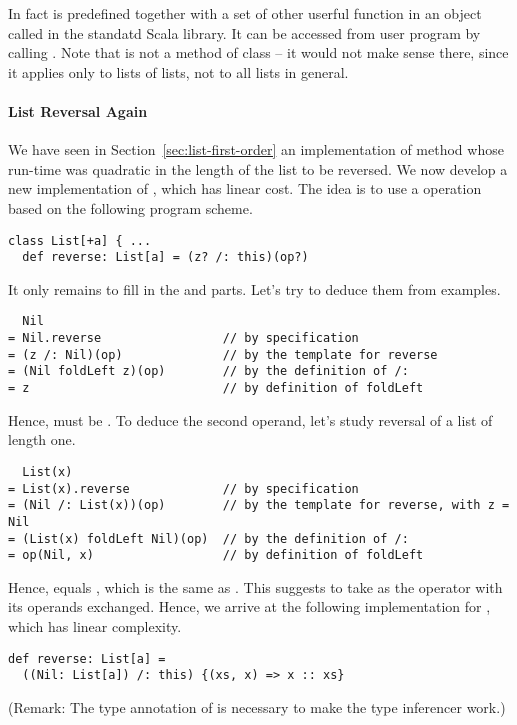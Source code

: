 \documentclass[a4paper,12pt,twoside,titlepage]{book}
\begin{document}
In fact  is predefined together with a set of other
userful function in an object called  in the standatd Scala
library. It can be accessed from user program by calling
. Note that  is not a method of class
 -- it would not make sense there, since it applies only
to lists of lists, not to all lists in general.

\paragraph{List Reversal Again} We have seen in 
Section~\ref{sec:list-first-order} an implementation of method
 whose run-time was quadratic in the length of the list
to be reversed. We now develop a new implementation of ,
which has linear cost.  The idea is to use a 
operation based on the following program scheme.
\begin{lstlisting}
class List[+a] { ...
  def reverse: List[a] = (z? /: this)(op?)
\end{lstlisting}
It only remains to fill in the  and  parts.  Let's
try to deduce them from examples.
\begin{lstlisting}
  Nil
= Nil.reverse                 // by specification
= (z /: Nil)(op)              // by the template for reverse
= (Nil foldLeft z)(op)        // by the definition of /:
= z                           // by definition of foldLeft
\end{lstlisting}
Hence,  must be . To deduce the second operand,
let's study reversal of a list of length one.
\begin{lstlisting}
  List(x)
= List(x).reverse             // by specification
= (Nil /: List(x))(op)        // by the template for reverse, with z = Nil
= (List(x) foldLeft Nil)(op)  // by the definition of /:
= op(Nil, x)                  // by definition of foldLeft
\end{lstlisting}
Hence,  equals , which is the same
as . This suggests to take as  the
\code{::} operator with its operands exchanged.  Hence, we arrive at
the following implementation for , which has linear complexity.
\begin{lstlisting}
def reverse: List[a] =
  ((Nil: List[a]) /: this) {(xs, x) => x :: xs}
\end{lstlisting}
(Remark: The type annotation of  is necessary 
to make the type inferencer work.)
\end{document}
